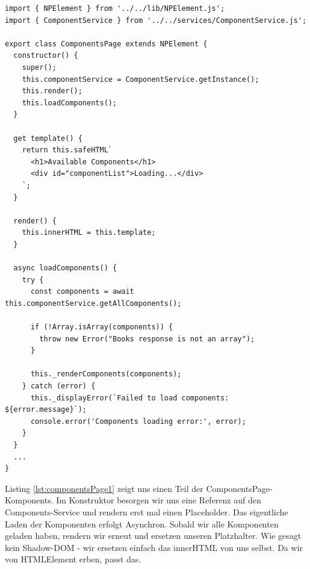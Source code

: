 \begin{listing}[H]
\begin{verbatim}
import { NPElement } from '../../lib/NPElement.js';
import { ComponentService } from '../../services/ComponentService.js';

export class ComponentsPage extends NPElement {
  constructor() {
    super();
    this.componentService = ComponentService.getInstance();
    this.render();
    this.loadComponents();
  }

  get template() {
    return this.safeHTML`
      <h1>Available Components</h1>
      <div id="componentList">Loading...</div>
    `;
  }

  render() {
    this.innerHTML = this.template;
  }

  async loadComponents() {
    try {
      const components = await this.componentService.getAllComponents();

      if (!Array.isArray(components)) {
        throw new Error("Books response is not an array");
      }

      this._renderComponents(components);
    } catch (error) {
      this._displayError(`Failed to load components: ${error.message}`);
      console.error('Components loading error:', error);
    }
  }
  ...
}
\end{verbatim}
\caption{ComponentsPage.js - Teil 1}
\label{lst:componentsPage1}
\end{listing}

Listing \ref{lst:componentsPage1} zeigt uns einen Teil der 
ComponentsPage-Komponents. Im Konstruktor besorgen wir uns
eine Referenz auf den Components-Service und rendern erst
mal einen Placeholder. Das eigentliche Laden der Komponenten erfolgt
Asynchron. Sobald wir alle Komponenten geladen haben, rendern wir
erneut und ersetzen unseren Platzhalter. Wie gesagt kein Shadow-DOM
- wir ersetzen einfach das innerHTML von uns selbst. Da wir von
HTMLElement erben, passt das.

